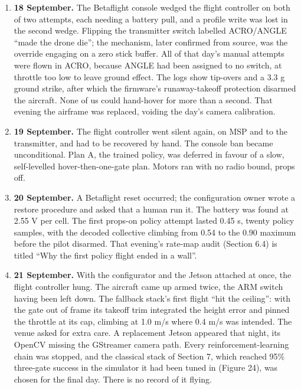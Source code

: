 \documentclass{article}
\begin{document}
\begin{enumerate}[leftmargin=*]
\item \textbf{18 September.} The Betaflight console wedged the flight controller on both of two attempts, each needing a battery pull, and a profile write was lost in the second wedge. Flipping the transmitter switch labelled ACRO/ANGLE ``made the drone die''; the mechanism, later confirmed from source, was the override engaging on a zero stick buffer. All of that day's manual attempts were flown in ACRO, because ANGLE had been assigned to no switch, at throttle too low to leave ground effect. The logs show tip-overs and a 3.3 g ground strike, after which the firmware's runaway-takeoff protection disarmed the aircraft. None of us could hand-hover for more than a second. That evening the airframe was replaced, voiding the day's camera calibration.
\item \textbf{19 September.} The flight controller went silent again, on MSP and to the transmitter, and had to be recovered by hand. The console ban became unconditional. Plan A, the trained policy, was deferred in favour of a slow, self-levelled hover-then-one-gate plan. Motors ran with no radio bound, props off.
\item \textbf{20 September.} A Betaflight reset occurred; the configuration owner wrote a restore procedure and asked that a human run it. The battery was found at 2.55 V per cell. The first props-on policy attempt lasted 0.45 s, twenty policy samples, with the decoded collective climbing from 0.54 to the 0.90 maximum before the pilot disarmed. That evening's rate-map audit (Section 6.4) is titled ``Why the first policy flight ended in a wall''.
\item \textbf{21 September.} With the configurator and the Jetson attached at once, the flight controller hung. The aircraft came up armed twice, the ARM switch having been left down. The fallback stack's first flight ``hit the ceiling'': with the gate out of frame its takeoff trim integrated the height error and pinned the throttle at its cap, climbing at 1.0 m/s where 0.4 m/s was intended. The venue asked for extra care. A replacement Jetson appeared that night, its OpenCV missing the GStreamer camera path. Every reinforcement-learning chain was stopped, and the classical stack of Section 7, which reached 95\% three-gate success in the simulator it had been tuned in (Figure 24), was chosen for the final day. There is no record of it flying.
\end{enumerate}
\end{document}

